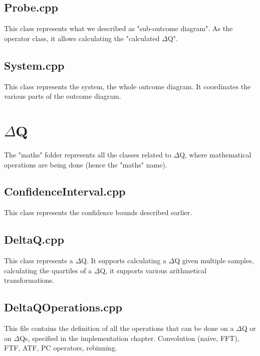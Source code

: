 \subsection{Probe.cpp} \label{code:probe}
This class represents what we described as "sub-outcome diagram". As the operator class, it allows calculating the "calculated $\Delta$Q".


\subsection{System.cpp} \label{code:sys}
This class represents the system, the whole outcome diagram. It coordinates the various parts of the outcome diagram.


\section{$\Delta$Q}
The "maths" folder represents all the classes related to $\Delta$Q, where mathematical operations are being done (hence the "maths" name).

\subsection{ConfidenceInterval.cpp} \label{code:ci}
This class represents the confidence bounds described earlier.


\subsection{DeltaQ.cpp} \label{code:dq}
This class represents a $\Delta$Q. It supports calculating a $\Delta$Q given multiple samples, calculating the quartiles of a $\Delta$Q, it supports various arithmetical transformations.


\subsection{DeltaQOperations.cpp} \label{code:dqop}
This file contains the definition of all the operations that can be done on a $\Delta$Q or on $\Delta$Qs, specified in the implementation chapter. Convolution (naive, FFT), FTF, ATF, PC operators, rebinning.


